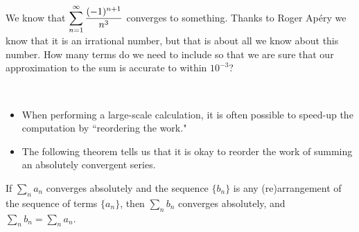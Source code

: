 \begin{example}
We know that $\displaystyle\sum_{n=1}^\infty\frac{(-1)^{n+1}}{n^3}$ converges to something.
Thanks to Roger Ap\'ery we know that it is an irrational number, but that is about all we know about this number.
How many terms do we need to include so that we are sure that our approximation to the sum is accurate to within $10^{-3}$?
\end{example}
\ifdefined\SOLUTION
{}
\fi
\newpage

\begin{remark}\,
\begin{itemize}
\item When performing a large-scale calculation, it is often possible to speed-up the computation by ``reordering the work."
\item The following theorem tells us that it is okay to reorder the work of summing an absolutely convergent series.
\end{itemize}
\end{remark}

\begin{theorem}
If $\sum_n a_n$ converges absolutely and the sequence $\{b_n\}$ is any (re)arrangement of the sequence of terms $\{a_n\}$, then $\sum_n b_n$ converges absolutely, and $\sum_n b_n = \sum_n a_n$.
\end{theorem}

